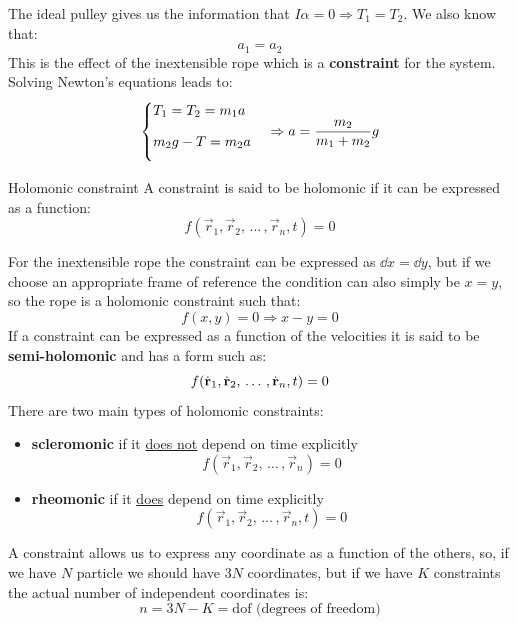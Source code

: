 The ideal pulley gives us the information that $I\alpha = 0 \Rightarrow T_1 = T_2$. We also know that:
\[a_1 = a_2\]
This is the effect of the inextensible rope which is a \textbf{constraint} for the system. Solving Newton's equations leads to:
\begin{equation}
    \centering
\begin{cases}
T_1=T_2=m_1a \\[8pt]
m_2g -T =m_2a \\[8pt]
\end{cases} \Rightarrow a = \dfrac{m_2}{m_1+m_2}g
\end{equation}
\begin{definition}{Holomonic constraint}
  A constraint is said to be holomonic if it can be expressed as a function:
  \begin{equation}
    f(\vec{r}_1,\vec{r}_2, \,\dots\, ,\vec{r}_n,t) = 0
  \end{equation}
\end{definition}
For the inextensible rope the constraint can be expressed as $\dd{x}=\dd{y}$, but if we choose an appropriate frame of reference the condition can also simply be $x=y$, so the rope is a holomonic constraint such that:
\begin{equation}
    f(x,y)=0 \Rightarrow x-y=0
\end{equation}
If a constraint can be expressed as a function of the velocities it is said to be \textbf{semi-holomonic} and has a form such as:
\begin{equation}
    f(\dot{\vb{r}}_1,\dot{\vb{r}}_2, \,\dots\, ,\dot{\vb{r}}_n,t) = 0
\end{equation}
There are two main types of holomonic constraints:
\begin{itemize}
    \item \textbf{scleromonic} if it \underline{does not} depend on time explicitly \[f(\vec{r}_1,\vec{r}_2, \,\dots\, ,\vec{r}_n) = 0\]
    \item \textbf{rheomonic} if it \underline{does} depend on time explicitly \[f(\vec{r}_1,\vec{r}_2, \,\dots\, ,\vec{r}_n,t) = 0\]
\end{itemize}
A constraint allows us to express any coordinate as a function of the others, so, if we have $N$ particle we should have $3N$ coordinates, but if we have $K$ constraints the actual number of independent coordinates is:
\begin{equation}
    n = 3N-K = \text{dof (degrees of freedom)}
\end{equation}
